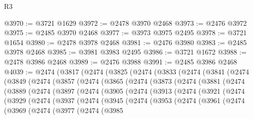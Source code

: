 \begin{lexlean}{R3}
\begin{coremodule}
@3970 := @3721 @1629
@3972 := @2478 @3970 @2468
@3973 := @2476 @3972
@3975 := @2485 @3970 @2468
@3977 := @3973 @3975 @2495
@3978 := @3721 @1654
@3980 := @2478 @3978 @2468
@3981 := @2476 @3980
@3983 := @2485 @3978 @2468
@3985 := @3981 @3983 @2495
@3986 := @3721 @1672
@3988 := @2478 @3986 @2468
@3989 := @2476 @3988
@3991 := @2485 @3986 @2468
@4039 := @2474
    (@3817
      (@2474
        (@3825
          (@2474
            (@3833
              (@2474
                (@3841
                  (@2474
                    (@3849
                      (@2474
                        (@3857
                          (@2474
                            (@3865
                              (@2474
                                (@3873
                                  (@2474
                                    (@3881
                                      (@2474
                                        (@3889
                                          (@2474
                                            (@3897
                                              (@2474
                                                (@3905
                                                  (@2474
                                                    (@3913
                                                      (@2474
                                                        (@3921
                                                          (@2474
                                                            (@3929
                                                              (@2474
                                                                (@3937
                                                                  (@2474
                                                                    (@3945
                                                                      (@2474
                                                                        (@3953
                                                                          (@2474
                                                                            (@3961
                                                                              (@2474
                                                                                (@3969
                                                                                  (@2474
                                                                                    (@3977
                                                                                      (@2474
                                                                                        (@3985

\end{coremodule}
\end{lexlean}

